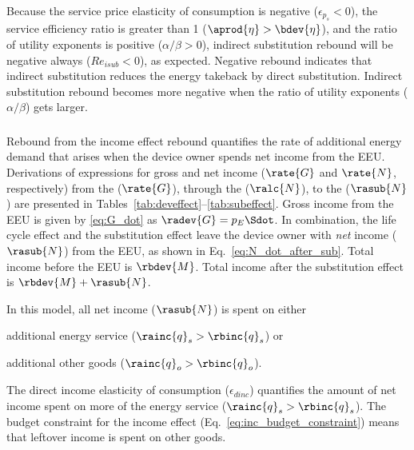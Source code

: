 Because the service price elasticity of consumption is negative ($\epsilon_{p_s} < 0$), 
the service efficiency ratio is greater than 1 ($\aprod{\eta} > \bdev{\eta}$), 
and
the ratio of utility exponents is positive ($\alpha / \beta > 0$),
indirect substitution rebound will be negative always ($Re_{isub} < 0$), 
as expected.
Negative rebound indicates that indirect substitution reduces the energy takeback by direct substitution.
Indirect substitution rebound becomes more negative 
when the ratio of utility exponents ($\alpha / \beta$) gets larger.


\subsubsection{\Inceffect{}} 
\label{sec:Re_inc}

Rebound from the income effect rebound quantifies the rate of additional energy demand 
that arises when the device owner spends net
income from the EEU.
Derivations of expressions for gross and net income ($\rate{G}$ and $\rate{N}$, respectively) from the 
\deveffect{} ($\rate{G}$), through the \lceffect{} ($\ralc{N}$), to the \subeffect{} ($\rasub{N}$)
are presented in Tables~\ref{tab:deveffect}--\ref{tab:subeffect}.
Gross income from the EEU is given by \ref{eq:G_dot}
as $\radev{G} = p_E \Sdot$. 
In combination, the life cycle effect and the substitution effect leave the device owner with
\emph{net} income ($\rasub{N}$) from the EEU,
as shown in Eq.~\ref{eq:N_dot_after_sub}.
Total income before the EEU is $\rbdev{M}$.
Total income after the substitution effect is $\rbdev{M} + \rasub{N}$.

In this model, all net income ($\rasub{N}$) is spent on either 
%
\begin{enumerate*}[label={(\alph*)}]
	
  \item additional energy service ($\rainc{q}_s > \rbinc{q}_s$) or
  
  \item additional other goods ($\rainc{q}_o > \rbinc{q}_o$).
    
\end{enumerate*}
%
The direct income elasticity of consumption ($\epsilon_{dinc}$) 
quantifies the amount of net income spent 
on more of the energy service ($\rainc{q}_s > \rbinc{q}_s$).
The budget constraint for the income effect (Eq.~\ref{eq:inc_budget_constraint}) 
means that leftover income is spent on other goods.

